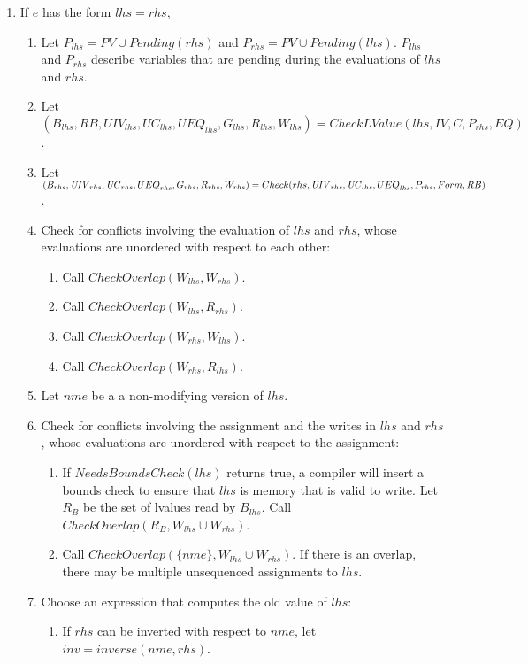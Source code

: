 \begin{enumerate}
\item If $e$ has the form $lhs = rhs$,
\label{list:check-assignment-struct}
\begin{enumerate}
\item Let $P_{lhs} = PV \cup Pending(rhs)$ and $P_{rhs} = PV \cup Pending(lhs).$   $P_{lhs}$
        and $P_{rhs}$ describe variables that are pending during the evaluations of $lhs$ and $rhs$.
\item Let $(B_{lhs}, RB, \mathit{UIV}_{lhs}, \mathit{UC}_{lhs}, {UEQ}_{lhs}, G_{lhs}, R_{lhs}, W_{lhs}) =
        CheckLValue(lhs, IV, C, P_{rhs}, EQ)$.  
\item Let $(B_{rhs}, \mathit{UIV}_{rhs},  \mathit{UC}_{rhs}, {UEQ}_{rhs}, G_{rhs}, R_{rhs}, W_{rhs}) = \\
        Check(rhs, \mathit{UIV}_{rhs}, \mathit{UC}_{lhs}, {UEQ}_{lhs}, P_{rhs}, Form, RB)$.
\item Check for conflicts involving the evaluation of $lhs$ and $rhs$, whose evaluations
are unordered with respect to each other:
\begin{enumerate}
\item Call $CheckOverlap(W_{lhs}, W_{rhs})$.
\item Call $CheckOverlap(W_{lhs}, R_{rhs})$.
\item Call $CheckOverlap(W_{rhs}, W_{lhs})$.
\item Call $CheckOverlap(W_{rhs}, R_{lhs})$.
\end{enumerate}
\item Let $nme$ be a a non-modifying version of $lhs$.
\item Check for conflicts involving the assignment and the writes in $lhs$ and $rhs$, whose
evaluations are unordered with respect to the assignment:
\begin{enumerate}
\item If $NeedsBoundsCheck(lhs)$ returns true, a compiler will insert a bounds check to ensure that 
$lhs$ is memory that is valid to write.  Let $R_B$ be the set of lvalues read by $B_{lhs}$.
Call $CheckOverlap(R_B, W_{lhs} \cup W_{rhs})$.
\item Call $CheckOverlap(\{nme\}, W_{lhs} \cup W_{rhs})$.  If there is an overlap, there may be
multiple unsequenced assignments to $lhs$.
\end{enumerate}
\item Choose an expression that computes the old value of $lhs$:
\begin{enumerate}
\item If $rhs$ can be inverted with respect to $nme$, let $inv = inverse(nme, rhs)$. 

\end{enumerate}
\end{enumerate}
\end{enumerate}
